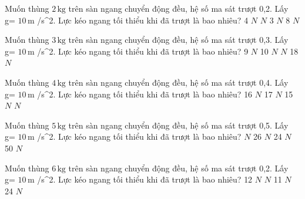 \begin{ex}
Muốn thùng $2\,\text{kg}$ trên sàn ngang chuyển động đều, hệ số ma sát trượt 0,2. Lấy g= $10\,\text{m}$ /s^2. Lực kéo ngang tối thiểu khi đã trượt là bao nhiêu?
\choice
{4 $N$}
{ $N$}
{3 $N$}
{8 $N$}
\end{ex}

\begin{ex}
Muốn thùng $3\,\text{kg}$ trên sàn ngang chuyển động đều, hệ số ma sát trượt 0,3. Lấy g= $10\,\text{m}$ /s^2. Lực kéo ngang tối thiểu khi đã trượt là bao nhiêu?
\choice
{9 $N$}
{10 $N$}
{ $N$}
{18 $N$}
\end{ex}

\begin{ex}
Muốn thùng $4\,\text{kg}$ trên sàn ngang chuyển động đều, hệ số ma sát trượt 0,4. Lấy g= $10\,\text{m}$ /s^2. Lực kéo ngang tối thiểu khi đã trượt là bao nhiêu?
\choice
{16 $N$}
{17 $N$}
{15 $N$}
{ $N$}
\end{ex}

\begin{ex}
Muốn thùng $5\,\text{kg}$ trên sàn ngang chuyển động đều, hệ số ma sát trượt 0,5. Lấy g= $10\,\text{m}$ /s^2. Lực kéo ngang tối thiểu khi đã trượt là bao nhiêu?
\choice
{ $N$}
{26 $N$}
{24 $N$}
{50 $N$}
\end{ex}

\begin{ex}
Muốn thùng $6\,\text{kg}$ trên sàn ngang chuyển động đều, hệ số ma sát trượt 0,2. Lấy g= $10\,\text{m}$ /s^2. Lực kéo ngang tối thiểu khi đã trượt là bao nhiêu?
\choice
{12 $N$}
{ $N$}
{11 $N$}
{24 $N$}
\end{ex}

